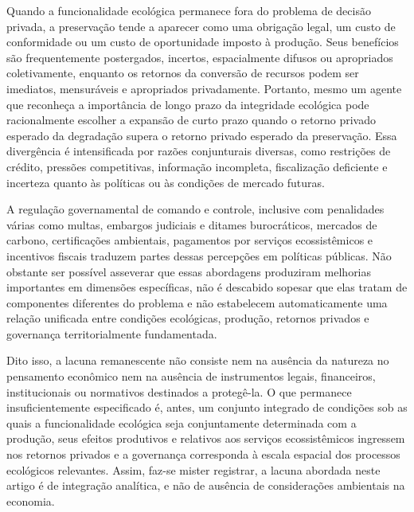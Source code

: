
Quando a funcionalidade ecológica permanece fora do problema de decisão privada, a preservação tende a aparecer como uma obrigação legal, um custo de conformidade ou um custo de oportunidade imposto à produção. Seus benefícios são frequentemente postergados, incertos, espacialmente difusos ou apropriados coletivamente, enquanto os retornos da conversão de recursos podem ser imediatos, mensuráveis e apropriados privadamente. Portanto, mesmo um agente que reconheça a importância de longo prazo da integridade ecológica pode racionalmente escolher a expansão de curto prazo quando o retorno privado esperado da degradação supera o retorno privado esperado da preservação. Essa divergência é intensificada por razões conjunturais diversas, como restrições de crédito, pressões competitivas, informação incompleta, fiscalização deficiente e incerteza quanto às políticas ou às condições de mercado futuras.

A regulação governamental de comando e controle, inclusive com penalidades várias como multas, embargos judiciais e ditames burocráticos, mercados de carbono, certificações ambientais, pagamentos por serviços ecossistêmicos e incentivos fiscais traduzem partes dessas percepções em políticas públicas. Não obstante ser possível asseverar que essas abordagens produziram melhorias importantes em dimensões específicas, não é descabido sopesar que elas tratam de componentes diferentes do problema e não estabelecem automaticamente uma relação unificada entre condições ecológicas, produção, retornos privados e governança territorialmente fundamentada.

Dito isso, a lacuna remanescente não consiste nem na ausência da natureza no pensamento econômico nem na ausência de instrumentos legais, financeiros, institucionais ou normativos destinados a protegê-la. O que permanece insuficientemente especificado é, antes, um conjunto integrado de condições sob as quais a funcionalidade ecológica seja conjuntamente determinada com a produção, seus efeitos produtivos e relativos aos serviços ecossistêmicos ingressem nos retornos privados e a governança corresponda à escala espacial dos processos ecológicos relevantes. Assim, faz-se mister registrar, a lacuna abordada neste artigo é de integração analítica, e não de ausência de considerações ambientais na economia.


